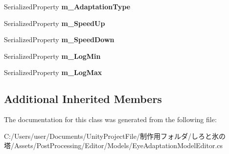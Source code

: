 \begin{DoxyCompactItemize}
Serialized\+Property {\bfseries m\+\_\+\+Adaptation\+Type}
\item 
\mbox{\label{class_unity_editor_1_1_post_processing_1_1_eye_adaptation_model_editor_ae139eda0e831f549143a0b7fb3c0d11b}} 
Serialized\+Property {\bfseries m\+\_\+\+Speed\+Up}
\item 
\mbox{\label{class_unity_editor_1_1_post_processing_1_1_eye_adaptation_model_editor_a10646c79673e25e9ba4dff9cdc1c182e}} 
Serialized\+Property {\bfseries m\+\_\+\+Speed\+Down}
\item 
\mbox{\label{class_unity_editor_1_1_post_processing_1_1_eye_adaptation_model_editor_a196d25464cff7b880a6873aa7d6ae857}} 
Serialized\+Property {\bfseries m\+\_\+\+Log\+Min}
\item 
\mbox{\label{class_unity_editor_1_1_post_processing_1_1_eye_adaptation_model_editor_a3beb13ab558d166a58e73475c959cc3d}} 
Serialized\+Property {\bfseries m\+\_\+\+Log\+Max}
\end{DoxyCompactItemize}
\subsection*{Additional Inherited Members}


The documentation for this class was generated from the following file\+:\begin{DoxyCompactItemize}
\item 
C\+:/\+Users/user/\+Documents/\+Unity\+Project\+File/制作用フォルダ/しろと氷の塔/\+Assets/\+Post\+Processing/\+Editor/\+Models/Eye\+Adaptation\+Model\+Editor.\+cs\end{DoxyCompactItemize}
